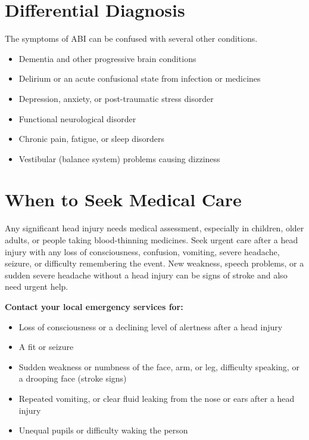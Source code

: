 \section*{Differential Diagnosis}
The symptoms of ABI can be confused with several other conditions.

\begin{itemize}
    \item Dementia and other progressive brain conditions
    \item Delirium or an acute confusional state from infection or medicines
    \item Depression, anxiety, or post-traumatic stress disorder
    \item Functional neurological disorder
    \item Chronic pain, fatigue, or sleep disorders
    \item Vestibular (balance system) problems causing dizziness
\end{itemize}

\section*{When to Seek Medical Care}
Any significant head injury needs medical assessment, especially in children, older adults, or people taking blood-thinning medicines. Seek urgent care after a head injury with any loss of consciousness, confusion, vomiting, severe headache, seizure, or difficulty remembering the event. New weakness, speech problems, or a sudden severe headache without a head injury can be signs of stroke and also need urgent help.

\textbf{Contact your local emergency services for:}
\begin{itemize}
    \item Loss of consciousness or a declining level of alertness after a head injury
    \item A fit or seizure
    \item Sudden weakness or numbness of the face, arm, or leg, difficulty speaking, or a drooping face (stroke signs)
    \item Repeated vomiting, or clear fluid leaking from the nose or ears after a head injury
    \item Unequal pupils or difficulty waking the person
\end{itemize}

